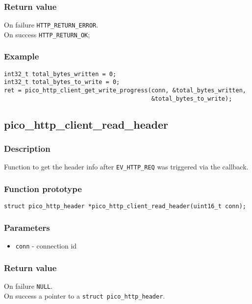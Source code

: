 \subsubsection*{Return value}
On failure \texttt{HTTP\_RETURN\_ERROR}.
\\On success \texttt{HTTP\_RETURN\_OK};
\subsubsection*{Example}
\begin{verbatim}
int32_t total_bytes_written = 0;
int32_t total_bytes_to_write = 0;
ret = pico_http_client_get_write_progress(conn, &total_bytes_written, 
                                          &total_bytes_to_write);
\end{verbatim}


\subsection{pico\_http\_client\_read\_header}

\subsubsection*{Description}
Function to get the header info after \texttt{EV\_HTTP\_REQ} was triggered via the callback.

\subsubsection*{Function prototype}
\texttt{struct pico\_http\_header *pico\_http\_client\_read\_header(uint16\_t conn);}

\subsubsection*{Parameters}
\begin{itemize}[noitemsep]
\item \texttt{conn} - connection id
\end{itemize}

\subsubsection*{Return value}
On failure \texttt{NULL}.
\\On success a pointer to a \texttt{struct pico\_http\_header}.

